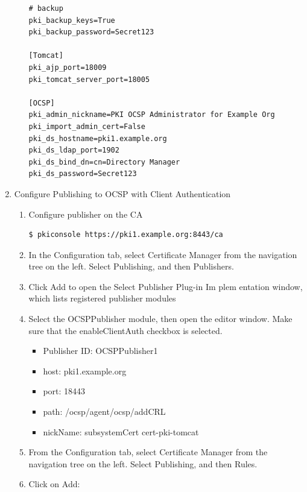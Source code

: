 \documentclass[12pt]{report}
\begin{document}
\begin{enumerate}[label*=\arabic*.]
\begin{enumerate}[label*=\arabic*.]
\begin{lstlisting}[style=configFile]
# backup
pki_backup_keys=True
pki_backup_password=Secret123

[Tomcat]
pki_ajp_port=18009
pki_tomcat_server_port=18005

[OCSP]
pki_admin_nickname=PKI OCSP Administrator for Example Org
pki_import_admin_cert=False
pki_ds_hostname=pki1.example.org
pki_ds_ldap_port=1902
pki_ds_bind_dn=cn=Directory Manager
pki_ds_password=Secret123
                    \end{lstlisting}
            \end{enumerate}
        \item Configure Publishing to OCSP with Client Authentication
             \begin{enumerate}[label*=\arabic*.]
                \item Configure publisher on the CA
                    \begin{lstlisting}[style=bashInputStyle]
$ pkiconsole https://pki1.example.org:8443/ca                    
                    \end{lstlisting}
                \item In the Configuration tab, select Certificate Manager from the navigation tree on
                    the left. Select Publishing, and then Publishers.
                \item Click Add to open the Select Publisher Plug-in Im plem entation window, which
                    lists registered publisher modules
                \item Select the OCSPPublisher module, then open the editor window. Make sure that the
                    enableClientAuth checkbox is selected.
                    \begin{itemize}
                        \item Publisher ID: OCSPPublisher1
                        \item host: pki1.example.org
                        \item port: 18443
                        \item path: /ocsp/agent/ocsp/addCRL
                        \item nickName: subsystemCert cert-pki-tomcat
                    \end{itemize}
                \item From the Configuration tab, select Certificate Manager from the navigation tree on the left. 
                    Select  Publishing, and then Rules.
                \item Click on Add:

\end{enumerate}
\end{enumerate}
\end{document}
